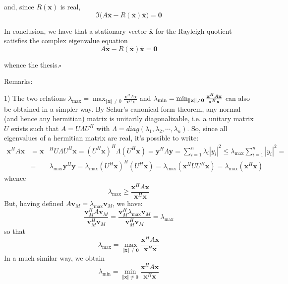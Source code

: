 \documentclass[12pt]{article}
\begin{document}
and, since $R(\mathbf{x})$ is real,
\begin{equation*}
\Im(A\overline{\mathbf{x}}-R(\overline{\mathbf{x}})\overline{\mathbf{x}
}\mathbf{)=0}
\end{equation*}

In conclusion, we have that a stationary vector $\overline{\mathbf{x}}$ for
the Rayleigh quotient satisfies the complex eigenvalue equation%
\begin{equation*}
A\overline{\mathbf{x}}-R(\overline{\mathbf{x}})\overline{\mathbf{x}}=\mathbf{0}
\end{equation*}

whence the thesis.$\square $

Remarks: 

1) The two relations $\lambda _{\max }=\max_{\Vert \mathbf{x}\Vert\neq 0}
\frac{\mathbf{x}^{H}A\mathbf{x}}{\mathbf{x}^{H}\mathbf{x}}$ and $\lambda
_{\min }=\min_{\Vert \mathbf{x\Vert \neq 0}}\frac{\mathbf{x}^{H}A\mathbf{x}}{%
\mathbf{x}^{H}\mathbf{x}}$ can also be obtained in a simpler way.
By Schur's canonical form theorem, any normal (and hence any hermitian)
matrix is unitarily diagonalizable, i.e. a unitary matrix $U$ exists such
that $A=U\Lambda U^{H}$ with $\Lambda =diag(\lambda _{1},\lambda
_{2},\cdots,\lambda _{n})$. So, since all eigenvalues of a hermitian matrix are
real, it's possible to write:
\begin{eqnarray*}
\mathbf{x}^{H}A\mathbf{x} &\mathbf{=x}&^{H}U\Lambda U^{H}\mathbf{x=}\left(
U^{H}\mathbf{x}\right) ^{H}\Lambda \left( U^{H}\mathbf{x}\right) =\mathbf{y}^{H}\Lambda \mathbf{y}=\sum_{i=1}^{n}\lambda _{i}\left\vert y_{i}\right\vert
^{2}\leq \lambda _{\max }\sum_{i=1}^{n}\left\vert y_{i}\right\vert ^{2}= \\
&=&\lambda _{\max }\mathbf{y}^{H}\mathbf{y=}\lambda _{\max }\left( U^{H}\mathbf{x}\right) ^{H}\left( U^{H}\mathbf{x}\right) =\lambda _{\max }\left( 
\mathbf{x}^{H}UU^{H}\mathbf{x}\right) \mathbf{=}\lambda _{\max }\left( 
\mathbf{x}^{H}\mathbf{x}\right) 
\end{eqnarray*}
whence
\begin{equation*}
\lambda _{\max }\geq \frac{\mathbf{x}^{H}A\mathbf{x}}{\mathbf{x}^{H}\mathbf{x}}
\end{equation*}
But, having defined $A\mathbf{v}_{M}=\lambda _{\max }\mathbf{v}_{M}$, we
have:
\begin{equation*}
\frac{\mathbf{v}_{M}^{H}A\mathbf{v}_{M}}{\mathbf{v}_{M}^{H}\mathbf{v}_{M}}=\frac{\mathbf{v}_{M}^{H}\lambda _{\max }\mathbf{v}_{M}}{\mathbf{v}_{M}^{H}\mathbf{v}_{M}}=\lambda _{\max }
\end{equation*}
so that
\begin{equation*}
\lambda _{\max }=\max_{\Vert \mathbf{x\Vert \neq 0}}\frac{\mathbf{x}^{H}A\mathbf{x}}{\mathbf{x}^{H}\mathbf{x}}
\end{equation*}
In a much similar way, we obtain
\begin{equation*}
\lambda _{\min }=\min_{\Vert \mathbf{x\Vert \neq 0}}\frac{\mathbf{x}^{H}A\mathbf{x}}{\mathbf{x}^{H}\mathbf{x}}
\end{equation*}
\end{document}
